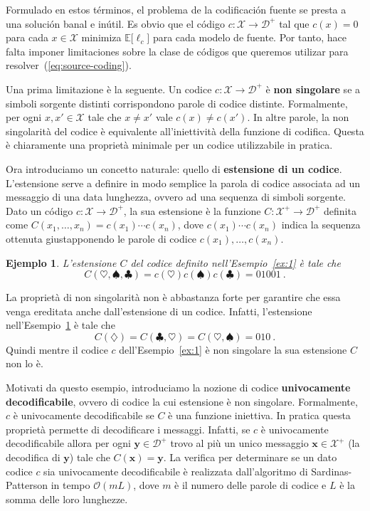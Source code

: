 \documentclass[11pt]{article}
\newtheorem{example}[theorem]{Ejemplo}
\newcommand{\bx}{ \boldsymbol{x} }
\newcommand{\by}{ \boldsymbol{y} }
\newcommand{\scD}{\mathcal{D}}
\newcommand{\scX}{\mathcal{X}}
\newcommand{\field}[1]{\mathbb{#1}}
\newcommand{\E}{\field{E}}
\begin{document}
Formulado en estos términos, el problema de la codificación fuente se presta a una solución banal e inútil. Es obvio que el código $c : \scX\to\scD^+$ tal que $c(x)=0$ para cada $x\in\scX$ minimiza $\E\bigl[\ell_c\bigr]$ para cada modelo de fuente. Por tanto, hace falta imponer limitaciones sobre la clase de códigos que queremos utilizar para resolver~(\ref{eq:source-coding}).

Una prima limitazione è la seguente. Un codice $c : \scX\to\scD^+$ è \textbf{non singolare} se a simboli sorgente distinti corrispondono parole di codice distinte. Formalmente, per ogni $x,x'\in\scX$ tale che $x \neq x'$ vale $c(x) \neq c(x')$. In altre parole, la non singolarità del codice è equivalente all'iniettività della funzione di codifica. Questa è chiaramente una proprietà minimale per un codice utilizzabile in pratica.

Ora introduciamo un concetto naturale: quello di \textbf{estensione di un codice}. L'estensione serve a definire in modo semplice la parola di codice associata ad un messaggio di una data lunghezza, ovvero ad una sequenza di simboli sorgente. Dato un código $c : \scX\to\scD^+$, la sua estensione è la funzione $C : \scX^+\to\scD^+$ definita come
$
    C(x_1,\dots,x_n) = c(x_1) \cdots c(x_n)
$, dove $c(x_1) \cdots c(x_n)$ indica la sequenza ottenuta giustapponendo le parole di codice $c(x_1),\dots,c(x_n)$.
%
\begin{example}
\label{ex:2}
L'estensione $C$ del codice definito nell'Esempio~\ref{ex:1} è tale che
\[
    C(\heartsuit,\spadesuit,\clubsuit) = c(\heartsuit)c(\spadesuit)c(\clubsuit) = 01001~.
\]
\end{example}
%
La proprietà di non singolarità non è abbastanza forte per garantire che essa venga ereditata anche dall'estensione di un codice. Infatti, l'estensione nell'Esempio~\ref{ex:2} è tale che
\[
    C(\diamondsuit) = C(\clubsuit,\heartsuit) = C(\heartsuit,\spadesuit) = 010~.
\]
Quindi mentre il codice $c$ dell'Esempio~\ref{ex:1} è non singolare la sua estensione $C$ non lo è.

Motivati da questo esempio, introduciamo la nozione di codice \textbf{univocamente decodificabile}, ovvero di codice la cui estensione è non singolare. Formalmente, $c$ è univocamente decodificabile se $C$ è una funzione iniettiva. In pratica questa proprietà permette di decodificare i messaggi. Infatti, se $c$ è univocamente decodificabile allora per ogni $\by\in\scD^+$ trovo al più un unico messaggio $\bx\in\scX^+$ (la decodifica di $\by$) tale che $C(\bx) = \by$. La verifica per determinare se un dato codice $c$ sia univocamente decodificabile è realizzata dall'algoritmo di Sardinas-Patterson in tempo $\mathcal{O}(mL)$, dove $m$ è il numero delle parole di codice e $L$ è la somma delle loro lunghezze.
\end{document}
